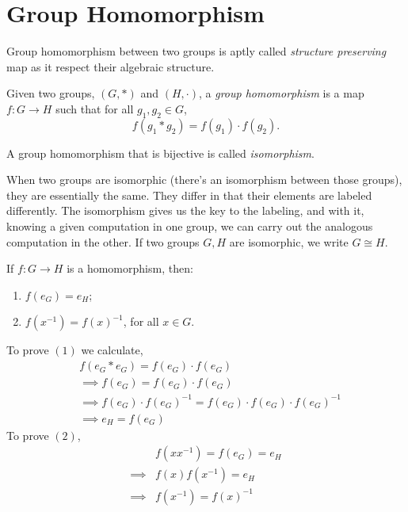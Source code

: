 \section{Group Homomorphism}
Group homomorphism between two groups is aptly called \textit{structure preserving} map as it respect their algebraic structure.
\begin{definition}
    Given two groups, $(G, *)$ and $(H, \cdot)$, a \textit{group homomorphism} is a map $f: G \rightarrow  H$ such that for all $g_1, g_2 \in G$, $$f(g_1 * g_2) = f(g_1) \cdot f(g_2).$$
\end{definition}
\begin{definition}[Isomorphism]
    A group homomorphism that is bijective is called \textit{isomorphism}.
\end{definition}
When two groups are isomorphic (there's an isomorphism between those groups), they are essentially the same. They differ in that their elements are labeled differently. The isomorphism gives us the key to the labeling, and with it, knowing a given computation in one group, we can carry out the analogous computation in the other. If two groups $G, H$ are isomorphic, we write $G \cong H$.
\begin{prop}
    If $f:G \rightarrow H$ is a homomorphism, then:
    \begin{enumerate}
        \item $f(e_G) = e_H$;
        \item $f(x^{-1}) = f(x)^{-1}$, for all $x \in G$.
    \end{enumerate}
\end{prop}
\begin{propproof}
    To prove $(1)$ we calculate, 
    \begin{align*}
        &f(e_G * e_G) = f(e_G) \cdot f(e_G)\\
        &\implies f(e_G) = f(e_G) \cdot f(e_G)\\
        &\implies f(e_G) \cdot f(e_G)^{-1} = f(e_G) \cdot f(e_G) \cdot f(e_G)^{-1}\\
        &\implies e_H = f(e_G)
    \end{align*}
    To prove $(2)$,
    \begin{align*}
        &f(xx^{-1}) = f(e_G) = e_H\\
        \implies &f(x)f(x^{-1}) = e_H\\
        \implies &f(x^{-1}) = f(x)^{-1}
    \end{align*}
\end{propproof}
